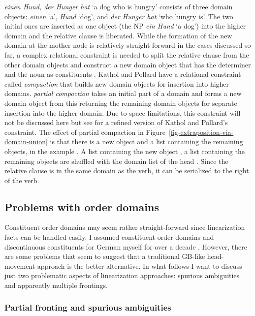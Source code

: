 \documentclass[output=paper]{langsci/langscibook}
\begin{document}
\emph{einen Hund, der Hunger hat} `a dog who is hungry' consists of three domain objects:
\emph{einen} `a', \emph{Hund} `dog', and \emph{der Hunger hat} `who hungry is'. The two initial ones
are inserted as one object (the NP \emph{ein Hund} `a dog') into the higher domain
and the relative clause is liberated. While the formation of the new domain at the mother node is
relatively straight-forward in the cases discussed so far, a complex relational constraint is needed
to split the relative clause  from the other domain objects and construct a new domain
object that has the determiner and the noun as constituents . Kathol and Pollard have a relational constraint called
\textit{compaction} that builds new domain objects for insertion into higher
domains. \textit{partial compaction} takes an initial part of a domain and forms a new domain object
from this returning the remaining domain objects for separate insertion into the higher domain. Due
to space limitations, this constraint will not be discussed here but see  for a refined version of Kathol and Pollard's constraint. The effect of partial
compaction in Figure~\ref{fig-extraposition-via-domain-union} is that there is a new object 
and a list containing the remaining objects, in the example . A list containing
the new object , a list containing the remaining objects  are
shuffled with the domain list of the head . Since the relative clause is in the same domain
as the verb, it can be serialized to the right of the verb.

\subsection{Problems with order domains}

Constituent order domains may seem rather straight-forward since linearization facts can be handled
easily. I assumed constituent order domains and discontinuous constituents for German myself for
over a decade \citep{Mueller95c,Mueller2004b}. However, there are some problems that seem to suggest
that a traditional GB-like head-movement approach is the better alternative. In what follows I want
to discuss just two problematic aspects of linearization approaches: spurious ambiguities and
apparently multiple frontings.

\subsubsection{Partial fronting and spurious ambiguities}
\end{document}
